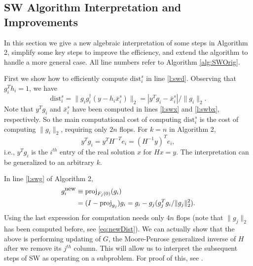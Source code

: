 \documentclass[12pt,Bold,letterpaper]{mcgilletdclass}
\newcommand{\dist}{\mathrm{dist}}
\newcommand{\vsp}{\vspace{\baselineskip}}
\begin{document}
\vsp \subsection{SW Algorithm Interpretation and Improvements}
\label{sec:improvedSW}
In this section we give a new algebraic interpretation of some steps in Algorithm 2,
simplify some key steps to improve the efficiency,
and  extend the algorithm to handle a more general case.
All line numbers refer to Algorithm \ref{alg:SWOrig}.

First we show  how to efficiently compute $\dist_i^s$ in line \ref{l:swd}. 
Observing that $g_i^Th_i = 1$, we have
\begin{equation}
\label{eq:newDist}
\dist_i^s =   \|  g_ig_i^\dag (y-h_i\bar{x}_i^s)  \|_2 
=    | y^Tg_i -\bar{x}_i^s |/\| g_i  \|_2.
\end{equation} 
Note that $y^Tg_i$ and $\bar{x}_i^s$ have been computed in lines \ref{l:swx} and \ref{l:swbx}, respectively.
So the main computational cost of computing $\dist_i^s$ is the cost of computing $\|g_i\|_2$,
requiring only $2n$ flops. 
For $k=n$ in Algorithm 2,  $$y^Tg_i=y^TH^{-T}e_i=(H^{-1}y)^Te_i,$$ i.e.,  $y^Tg_i$
is the $i^{th}$ entry of the real solution $x$ for $Hx=y$. 
The interpretation can be generalized to  an arbitrary $k$. 

In line \ref{l:swg} of Algorithm 2,  
\begin{align}
g_i^{\small \mbox{new}} & \equiv \mbox{proj}_{F_j(0)}(g_i)   \nonumber \\
  & =(I- \mbox{proj}_{g_j})g_i=g_i- g_j(g_j^Tg_i/\|g_j\|_2^2). \label{eq:gup}
\end{align}
Using the last expression for computation needs only $4n$ flops
(note that $\|g_j\|_2$ has been computed before, see \eqref{eq:newDist}).
We can actually show that the above is performing updating of $G$, the Moore-Penrose generalized inverse of
$H$ after we remove its $j^{th}$ column. This will allow us to interpret the subsequent steps of SW as operating on a subproblem. For proof of this, see \cite{Cli64}.
\end{document}
